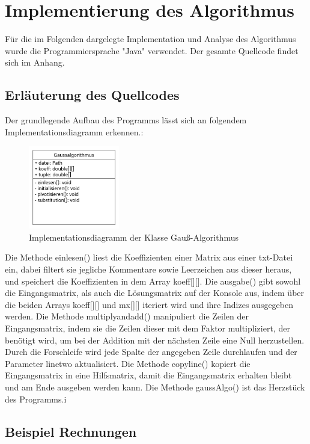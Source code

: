 \documentclass[a4paper, 12pt]{report}
\begin{document}
\begin{sloppypar}
{\let\clearpage\relax \chapter{Implementierung des Algorithmus}}
Für die im Folgenden dargelegte Implementation und Analyse des Algorithmus wurde die Programmiersprache "Java" verwendet. Der gesamte Quellcode findet sich im Anhang.

\section{Erläuterung des Quellcodes}
Der grundlegende Aufbau des Programms lässt sich an folgendem Implementationsdiagramm erkennen.:
\begin{figure}[h]
    \centering
    \includegraphics[width=150px]{"./gaussuml.png"}
    \caption{Implementationsdiagramm der Klasse Gauß-Algorithmus}
\end{figure}
\newline
Die Methode einlesen() liest die Koeffizienten einer Matrix aus einer txt-Datei ein, dabei filtert sie jegliche Kommentare
sowie Leerzeichen aus dieser heraus, und speichert die Koeffizienten in dem Array koeff[][].
Die ausgabe() gibt sowohl die Eingangsmatrix, als auch die Lösungsmatrix auf der Konsole aus, indem über die beiden Arrays koeff[][] und mx[][] iteriert wird
und ihre Indizes ausgegeben werden.
Die Methode multiplyandadd() manipuliert die Zeilen der Eingangsmatrix, indem sie die Zeilen dieser
mit dem Faktor multipliziert, der benötigt wird, um bei der Addition mit der nächsten Zeile eine Null herzustellen. Durch die Forschleife wird jede Spalte der angegeben
Zeile durchlaufen und der Parameter linetwo aktualisiert.
Die Methode copyline() kopiert die Eingangsmatrix in eine Hilfsmatrix, damit die Eingangsmatrix erhalten bleibt und am Ende ausgeben werden kann.
Die Methode gaussAlgo() ist das Herzstück des Programms.i %


\section{Beispiel Rechnungen}

\end{sloppypar}
\end{document}
